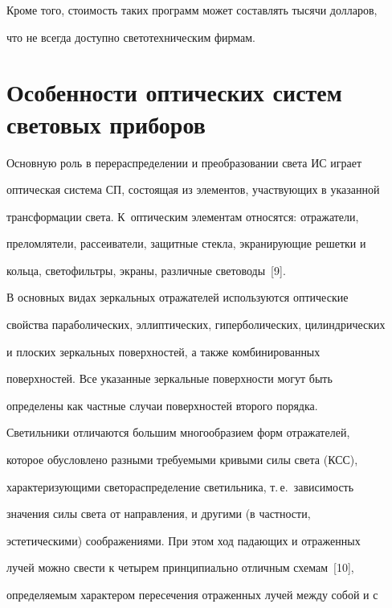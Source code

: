  


  Кроме того, стоимость таких программ может составлять тысячи долларов, 


что не всегда доступно светотехническим фирмам.


  


\section{Особенности оптических систем световых приборов}


  


  Основную роль в перераспределении и преобразовании света ИС играет 


оптическая система СП, состоящая из элементов, участвующих в указанной 


трансформации света. К~оптическим элементам относятся: отражатели, 


преломлятели, рассеиватели, защитные стекла, экранирующие решетки и 


кольца, светофильтры, экраны, различные световоды~[9].


  


  В основных видах зеркальных отражателей используются оптические 


свойства параболических, эллиптических, гиперболических, цилиндрических 


и плоских зеркальных поверхностей, а также комбинированных 


поверхностей. Все указанные зеркальные поверхности могут быть 


определены как частные случаи поверхностей второго порядка.


  


  Светильники отличаются большим многообразием форм отражателей, 


которое обусловлено разными требуемыми кривыми силы света (КСС), 


характеризующими светораспределение светильника, т.\,е.\ зависимость 


значения силы света от направления, и другими (в част\-ности, 


эстетическими) соображениями. При этом ход падающих и отраженных 


лучей можно свести к четырем принципиально отличным схемам~[10], 


определяемым характером пересечения отраженных лучей между собой и с 


